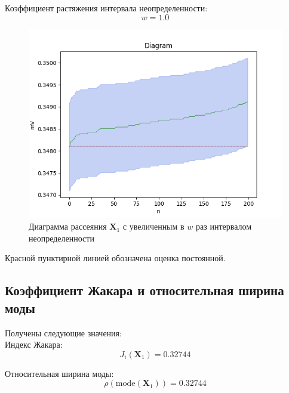 Коэффициент растяжения интервала неопределенности: 
\begin{equation*}
	w = 1.0
\end{equation*}

\begin{figure}[H]
	\begin{center}
		\includegraphics[scale = 0.55]{resources/diagram_beta_0.3481063.png}
	\end{center}
	\caption{Диаграмма рассеяния $\bm{X}_1$ с увеличенным в $w$ раз интервалом неопределенности}
\end{figure}

Красной пунктирной линией обозначена оценка постоянной.

\subsection{Коэффициент Жакара и относительная ширина моды}

Получены следующие значения: \\
Индекс Жакара: 
\begin{equation*}
	J_i(\bm{X}_1) = 0.32744
\end{equation*}

Относительная ширина моды: 
\begin{equation*}
	\rho(\text{mode}(\bm{X}_1)) = 0.32744
\end{equation*}

\newpage